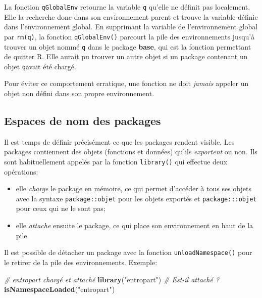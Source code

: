 \documentclass[
  12pt,
  french,
  a4paper,
  extrafontsizes,onecolumn,openright
  ]{memoir}
\newenvironment{Shaded}{\begin{snugshade}}{\end{snugshade}}
\newcommand{\CommentTok}[1]{\textcolor[rgb]{0.56,0.35,0.01}{\textit{#1}}}
\newcommand{\KeywordTok}[1]{\textcolor[rgb]{0.13,0.29,0.53}{\textbf{#1}}}
\newcommand{\NormalTok}[1]{#1}
\newcommand{\StringTok}[1]{\textcolor[rgb]{0.31,0.60,0.02}{#1}}
\providecommand{\tightlist}{%
  \setlength{\itemsep}{0pt}\setlength{\parskip}{0pt}}
\begin{document}
La fonction \texttt{qGlobalEnv} retourne la variable \texttt{q} qu'elle ne définit pas localement.
Elle la recherche donc dans son environnement parent et trouve la variable définie dans l'environnement global.
En supprimant la variable de l'environnement global par \texttt{rm(q)}, la fonction \texttt{qGlobalEnv()} parcourt la pile des environnements jusqu'à trouver un objet nommé \texttt{q} dans le package \textbf{base}, qui est la fonction permettant de quitter R.
Elle aurait pu trouver un autre objet si un package contenant un objet \texttt{q}avait été chargé.

Pour éviter ce comportement erratique, une fonction ne doit \emph{jamais} appeler un objet non défini dans son propre environnement.

\hypertarget{espaces-de-nom-des-packages}{%
\subsection{Espaces de nom des packages}\label{espaces-de-nom-des-packages}}

Il est temps de définir précisément ce que les packages rendent visible.
Les packages contiennent des objets (fonctions et données) qu'ils \emph{exportent} ou non.
Ils sont habituellement appelés par la fonction \texttt{library()} qui effectue deux opérations:

\begin{itemize}
\tightlist
\item
  elle \emph{charge} le package en mémoire, ce qui permet d'accéder à tous ses objets avec la syntaxe \texttt{package::objet} pour les objets exportés et \texttt{package:::objet} pour ceux qui ne le sont pas;
\item
  elle \emph{attache} ensuite le package, ce qui place son environnement en haut de la pile.
\end{itemize}

Il est possible de détacher un package avec la fonction \texttt{unloadNamespace()} pour le retirer de la pile des environnements.
Exemple:

\scriptsize

\begin{Shaded}
\begin{Highlighting}[]
\CommentTok{# entropart chargé et attaché}
\KeywordTok{library}\NormalTok{(}\StringTok{"entropart"}\NormalTok{)}
\CommentTok{# Est-il attaché ?}
\KeywordTok{isNamespaceLoaded}\NormalTok{(}\StringTok{"entropart"}\NormalTok{)}
\end{Highlighting}
\end{Shaded}
\end{document}
